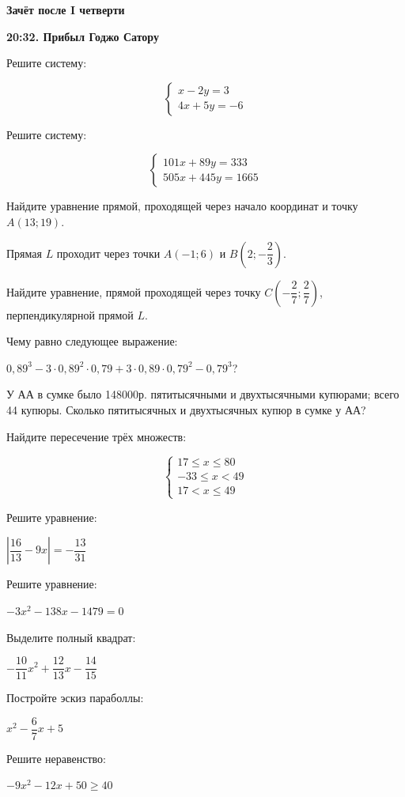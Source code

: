 \centerline{\bf \Huge Зачёт после I четверти}
\centerline{\bf \Huge }

\begin{flushright}
        \scriptsize{\textbf{20:32. Прибыл Годжо Сатору}}
\end{flushright}

 Решите систему:

\begin{equation*}
 \begin{cases}
   x - 2y = 3
   \\
   4x + 5y = -6
 \end{cases}
\end{equation*}

 Решите систему:

\begin{equation*}
 \begin{cases}
   101x + 89y = 333
   \\
   505x + 445y = 1665
 \end{cases}
\end{equation*}

 Найдите уравнение прямой, проходящей через начало координат и точку $A(13;19)$.

 Прямая $L$ проходит через точки $A(-1;6)$ и $B(2;-\dfrac{2}{3})$.

Найдите уравнение, прямой проходящей через точку $C(-\dfrac{2}{7};\dfrac{2}{7})$, перпендикулярной прямой $L$.

 Чему равно следующее выражение: 

$0,89^3-3\cdot0,89^2\cdot0,79+3\cdot0,89\cdot0,79^2-0,79^3$?\

 У АА в сумке было 148000р. пятитысячными и двухтысячными купюрами; всего 44 купюры. Сколько пятитысячных и двухтысячных купюр в сумке у АА?

 Найдите пересечение трёх множеств:

\begin{equation*}
 \begin{cases}
   17 \leqslant x  \leqslant 80
   \\
   -33 \leqslant x  < 49
   \\
    17 < x  \leqslant 49
 \end{cases}
\end{equation*}

 Решите уравнение:

$\left|\dfrac{16}{13}-9x\right|=-\dfrac{13}{31}$

 Решите уравнение:

$-3x^2-138x-1479=0$

 Выделите полный квадрат:

$-\dfrac{10}{11}x^2+\dfrac{12}{13}x-\dfrac{14}{15}$

 Постройте эскиз параболлы:

$x^2-\dfrac{6}{7}x+5$

 Решите неравенство:

$-9x^2-12x+50\geqslant40$